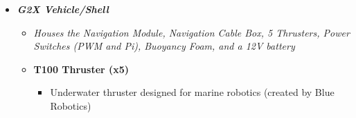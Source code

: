 \documentclass[12pt]{article}
\begin{document}
{{\begin{itemize}
\begin{itemize}
\begin{itemize}
						\item Wavelength: 1310nm
					\end{itemize}
					\item[] \textbf{4-Port Gb Switch}
					\begin{itemize}
						\item Allows different devices on a network to communicate
						\item 4 auto-sensing Gigabit Ethernet ports
						\item Non-blocking switching architecture
					\end{itemize}
					\item[] \textbf{Fiberoptic Tether}
					\begin{itemize}
						\item Provides Fiberoptic connection (2000 ft. of tether) to the Communicator on the Handling Gear
						\item Communicator provides media converter between Fiberoptic and Ethernet (external PC Ethernet connection) 
					\end{itemize}
					\item[] \textbf{Navigation Fiberoptic Cable Plugin}
					\begin{itemize}
						\item Provides the Fiberoptic cable plugin (user plugs in cable) between the communications module and navigation module
					\end{itemize}
					\item[] \textbf{Misc.}
					\begin{itemize}
						\item Pi Camera V2
						\item Realtime Clock (I2C)
						\item Power Supply (5V from fiber optic connection)\\\\
					\end{itemize}
				\end{itemize}
				\item \textbf{\textit{G2X Vehicle/Shell}}
				\begin{itemize}	
					\item[] \textit{Houses the Navigation Module, Navigation Cable Box, 5 Thrusters, Power Switches (PWM and Pi), Buoyancy Foam, and a 12V battery\\}
					\item[] \textbf{T100 Thruster (x5)}
					\begin{itemize}
						\item Underwater thruster designed for marine robotics (created by Blue Robotics)

\end{itemize}
\end{itemize}
\end{itemize}}}
\end{document}
